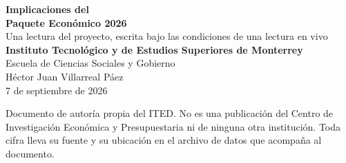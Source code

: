 \thispagestyle{empty}
\begin{center}
\vspace*{3.2cm}
{\Huge\bfseries Implicaciones del\\[6pt] Paquete Económico 2026}\\[1.4cm]
{\large Una lectura del proyecto, escrita bajo las condiciones de una lectura en vivo}\\[2.6cm]
{\large\bfseries Instituto Tecnológico y de Estudios Superiores de Monterrey}\\[4pt]
{\large Escuela de Ciencias Sociales y Gobierno}\\[1.6cm]
{\large Héctor Juan Villarreal Páez}\\[2.4cm]
{\large 7 de septiembre de 2026}
\end{center}
\vfill
\begin{center}\small
Documento de autoría propia del ITED. No es una publicación del Centro de Investigación
Económica y Presupuestaria ni de ninguna otra institución. Toda cifra lleva su fuente y su
ubicación en el archivo de datos que acompaña al documento.
\end{center}
\clearpage

